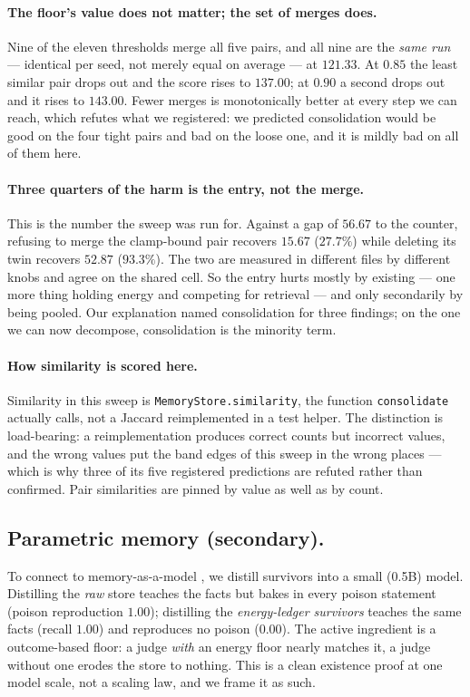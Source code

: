 \paragraph{The floor's value does not matter; the set of merges does.}
Nine of the eleven thresholds merge all five pairs, and all nine are the
\emph{same run} --- identical per seed, not merely equal on average ---
at $121.33$. At $0.85$ the least similar pair drops out and the score
rises to $137.00$; at $0.90$ a second drops out and it rises to
$143.00$. Fewer merges is monotonically better at every step we can
reach, which refutes what we registered: we predicted consolidation
would be good on the four tight pairs and bad on the loose one, and it
is mildly bad on all of them here.

\paragraph{Three quarters of the harm is the entry, not the merge.}
This is the number the sweep was run for. Against a gap of $56.67$ to
the counter, refusing to merge the clamp-bound pair recovers $15.67$
($27.7\%$) while deleting its twin recovers $52.87$ ($93.3\%$). The two
are measured in different files by different knobs and agree on the
shared cell. So the entry hurts mostly by existing --- one more thing
holding energy and competing for retrieval --- and only secondarily by
being pooled. Our explanation named consolidation for three findings; on
the one we can now decompose, consolidation is the minority term.

\paragraph{How similarity is scored here.} Similarity in this sweep is
\texttt{MemoryStore.similarity}, the function \texttt{consolidate}
actually calls, not a Jaccard reimplemented in a test helper. The
distinction is load-bearing: a reimplementation produces correct counts
but incorrect values, and the wrong values put the band edges of this
sweep in the wrong places --- which is why three of its five registered
predictions are refuted rather than confirmed. Pair similarities are
pinned by value as well as by count.

\subsection{Parametric memory (secondary).}
To connect to memory-as-a-model \citep{quek2026memo}, we distill survivors
into a small (0.5B) model. Distilling the \emph{raw} store teaches the
facts but bakes in every poison statement (poison reproduction $1.00$);
distilling the \emph{energy-ledger survivors} teaches the same facts
(recall $1.00$) and reproduces no poison ($0.00$). The active ingredient
is a outcome-based floor: a judge \emph{with} an energy floor nearly
matches it, a judge without one erodes the store to nothing. This is a
clean existence proof at one model scale, not a scaling law, and we frame
it as such.


